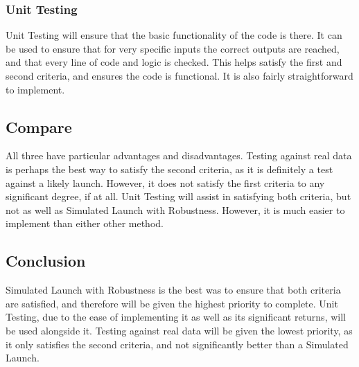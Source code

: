 \documentclass[onecolumn, draftclsnofoot,10pt, compsoc]{IEEEtran}
\begin{document}
\subsubsection{Unit Testing}
Unit Testing will ensure that the basic functionality of the code is there. It can be used to ensure that for very specific inputs the correct outputs are reached, and that every line of code and logic is checked. This helps satisfy the first and second criteria, and ensures the code is functional. It is also fairly straightforward to implement.
\subsection{Compare}
All three have particular advantages and disadvantages. Testing against real data is perhaps the best way to satisfy the second criteria, as it is definitely a test against a likely launch. However, it does not satisfy the first criteria to any significant degree, if at all. Unit Testing will assist in satisfying both criteria, but not as well as Simulated Launch with Robustness. However, it is much easier to implement than either other method.
\subsection{Conclusion}
Simulated Launch with Robustness is the best was to ensure that both criteria are satisfied, and therefore will be given the highest priority to complete. Unit Testing, due to the ease of implementing it as well as its significant returns, will be used alongside it. Testing against real data will be given the lowest priority, as it only satisfies the second criteria, and not significantly better than a Simulated Launch.
\end{document}
